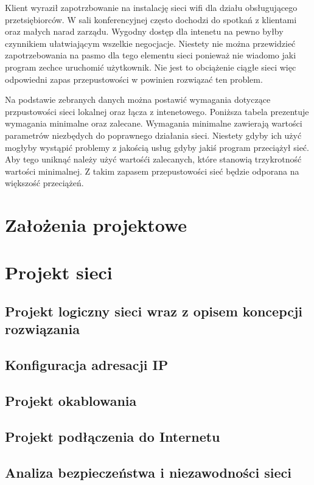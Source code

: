 \documentclass{report}
\begin{document}
Klient wyraził zapotrzbowanie na instalację sieci wifi dla działu obsługującego przetsiębiorców. W sali konferencyjnej często dochodzi  
do spotkań z klientami oraz małych narad zarządu. Wygodny dostęp dla intenetu na pewno byłby czynnikiem ułatwiającym wszelkie negocjacje.
Niestety nie można przewidzieć zapotrzebowania na pasmo dla tego elementu sieci ponieważ nie wiadomo jaki program zechce uruchomić użytkownik.
Nie jest to obciążenie ciągłe sieci więc odpowiedni zapas przepustowości w powinien rozwiązać ten problem.

Na podstawie zebranych danych można postawić wymagania dotyczące przpustowości sieci lokalnej oraz łącza z intenetowego. Poniższa tabela
prezentuje wymagania minimalne oraz zalecane. Wymagania minimalne zawierają wartości parametrów niezbędych do poprawnego działania sieci. 
Niestety gdyby ich użyć mogłyby wystąpić problemy z jakością usług gdyby jakiś program przeciążył sieć. Aby tego uniknąć należy użyć wartośći
zalecanych, które stanowią trzykrotność wartości minimalnej. Z takim zapasem przepustowości sieć będzie odporana na większość przeciążeń.



\chapter{Założenia projektowe}
\chapter{Projekt sieci}
\section{Projekt logiczny sieci wraz z opisem koncepcji rozwiązania}
\section{Konfiguracja adresacji IP}
\section{Projekt okablowania}
\section{Projekt podłączenia do Internetu}
\section{Analiza bezpieczeństwa i niezawodności sieci}
\end{document}
